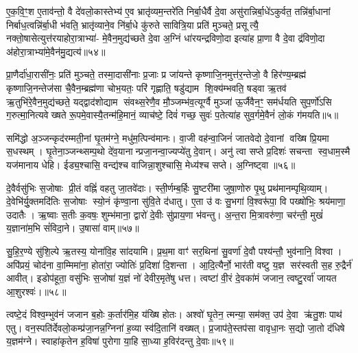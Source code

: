 ए॒क॒वि॒ꣳ॒श ए॒ताव॑न्तो॒ वै दे॑वलो॒कास्तेभ्य॑ ए॒व भ्रातृ॑व्यम॒न्तरे॑ति निर्बा॒धैर्वै दे॒वा असु॑रान्निर्बा॒धे॑ऽकुर्वत॒ तन्नि॑र्बा॒धानां निर्बाध॒त्वन्नि॑र्बा॒धी भ॑वति॒ भ्रातृ॑व्याने॒व नि॑र्बा॒धे कु॑रुते सावित्रि॒या प्रति॑ मुञ्चते॒ प्रसूत्यै॒ नक्तो॒षासेत्युत्त॑रयाहोरा॒त्राभ्या॑- मे॒वैन॒मुद्य॑च्छते दे॒वा अ॒ग्निं धा॑रयन्द्रविणो॒दा इत्या॑ह प्रा॒णा वै दे॒वा द्र॑विणो॒दा अ॑होरा॒त्राभ्या॑मे॒वैन॑मु॒द्यत्य॑॥५४॥

प्रा॒णैर्दा॑धा॒रासी॑नः॒ प्रति॑ मुञ्चते॒ तस्मा॒दासी॑नाः प्र॒जाः प्र जा॑यन्ते कृष्णाजि॒नमुत्त॑र॒न्तेजो॒ वै हिर॑ण्य॒म्ब्रह्म॑ कृष्णाजि॒नन्तेज॑सा चै॒वैन॒म्ब्रह्म॑णा चोभ॒यतः॒ परि॑ गृह्णाति॒ षडु॑द्याम शि॒क्य॑म्भवति॒ षड्वा ऋ॒तव॑ ऋ॒तुभि॑रे॒वैन॒मुद्य॑च्छते॒ यद्द्वाद॑शोद्याम संवथ्स॒रेणै॒व मौ॒ञ्जम्भ॑व॒त्यूर्ग्वै मुञ्जा॑ ऊ॒र्जैवैन॒ꣳ॒ सम॑र्धयति सुप॒र्णो॑ऽसि ग॒रुत्मा॒नित्यवेख्षते रू॒पमे॒वास्यै॒तन्म॑हि॒मानं॒ व्याच॑ष्टे॒ दिवं॑ गच्छ॒ सुवः॑ प॒तेत्या॑ह सुव॒र्गमे॒वैनं॑ लो॒कं ग॑मयति॥५॥

{\anuvakamend[{रख्षा॒ꣳ॒स्यौदु॑म्बरी आदि॒त्य उ॒द्यत्य॒ स़ञ्चतु॑र्विशतिश्च॥10॥}]}

समि॑द्धो अ॒ञ्जन्कृद॑रम्मती॒नां घृ॒तम॑ग्ने॒ मधु॑म॒त्पिन्व॑मानः। वा॒जी वह॑न्वा॒जिनं॑ जातवेदो दे॒वानां वख्षि प्रि॒यमा स॒धस्थम्। घृ॒तेना॒ञ्जन्थ्सम्प॒थो दे॑व॒यानान्प्रजा॒नन्वा॒ज्यप्ये॑तु दे॒वान्। अनु॑ त्वा सप्ते प्र॒दिशः॑ सचन्ता स्व॒धाम॒स्मै यज॑मानाय धेहि। ईड्य॒श्चासि॒ वन्द्य॑श्च वाजिन्ना॒शुश्चासि॒ मेध्य॑श्च सप्ते। अ॒ग्निष्ट्वा॥५६॥

दे॒वैर्वसु॑भिः स॒जोषाः प्री॒तं वह्निं॑ वहतु जा॒तवे॑दाः। स्ती॒र्णम्ब॒र्\mbox{}हिः सु॒ष्टरी॑मा जुषा॒णोरु पृ॒थु प्रथ॑मानम्पृथि॒व्याम्। दे॒वेभि॑र्यु॒क्तमदि॑तिः स॒जोषाः स्यो॒नं कृ॑ण्वा॒ना सु॑वि॒ते द॑धातु। ए॒ता उ॑ वः सु॒भगा॑ वि॒श्वरू॑पा॒ वि पख्षो॑भिः॒ श्रय॑माणा॒ उदातैः। ऋ॒ष्वाः स॒तीः क॒वषः॒ शुम्भ॑माना॒ द्वारो॑ दे॒वीः सु॑प्राय॒णा भ॑वन्तु। अ॒न्त॒रा मि॒त्रावरु॑णा॒ चर॑न्ती॒ मुखं॑ य॒ज्ञाना॑म॒भि सं॑विदा॒ने। उ॒षासा॑ वाम्॥५७॥

सु॒हि॒र॒ण्ये सु॑शि॒ल्पे ऋ॒तस्य॒ योना॑वि॒ह सा॑दयामि। प्र॒थ॒मा वाꣳ॑ सर॒थिना॑ सु॒वर्णा॑ दे॒वौ पश्य॑न्तौ॒ भुव॑नानि॒ विश्वा। अपि॑प्रयं॒ चोद॑ना वा॒म्मिमा॑ना॒ होता॑रा॒ ज्योतिः॑ प्र॒दिशा॑ दि॒शन्ता। आ॒दि॒त्यैर्नो॒ भार॑ती वष्टु य॒ज्ञ सर॑स्वती स॒ह रु॒द्रैर्न॑ आवीत्। इडोप॑हूता॒ वसु॑भिः स॒जोषा॑ य॒ज्ञं नो॑ देवीर॒मृते॑षु धत्त। त्वष्टा॑ वी॒रं दे॒वका॑मं जजान॒ त्वष्टु॒रर्वा॑ जायत आ॒शुरश्वः॑।॥५८॥

त्वष्टे॒दं विश्व॒म्भुव॑नं जजान ब॒होः क॒र्तार॑मि॒ह य॑ख्षि होतः। अश्वो॑ घृ॒तेन॒ त्मन्या॒ सम॑क्त॒ उप॑ दे॒वा ऋ॑तु॒शः पाथ॑ एतु। वन॒स्पति॑र्देवलो॒कम्प्र॑जा॒नन्न॒ग्निना॑ ह॒व्या स्व॑दि॒तानि॑ वख्षत्। प्र॒जाप॑ते॒स्तप॑सा वावृधा॒नः स॒द्यो जा॒तो द॑धिषे य॒ज्ञम॑ग्ने। स्वाहा॑कृतेन ह॒विषा॑ पुरोगा या॒हि सा॒ध्या ह॒विर॑दन्तु दे॒वाः॥५९॥

